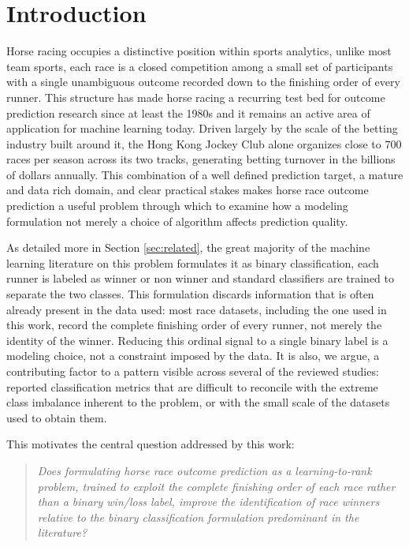 \section{Introduction}
\label{sec:introduction}

Horse racing occupies a distinctive position within sports analytics, unlike most team sports, each race is a closed competition among a small set of participants with a single unambiguous outcome recorded down to the finishing order of every runner. This structure has made horse racing a recurring test bed for outcome prediction research since at least the 1980s \cite{article} and it remains an active area of application for machine learning today. Driven largely by the scale of the betting industry built around it, the Hong Kong Jockey Club alone organizes close to 700 races per season across its two tracks, generating betting turnover in the billions of dollars annually. This combination of a well defined prediction target, a mature and data rich domain, and clear practical stakes makes horse race outcome prediction a useful problem through which to examine how a modeling formulation not merely a choice of algorithm affects prediction quality.

As detailed more in Section \ref{sec:related}, the great majority of the machine learning literature on this problem formulates it as binary classification, each runner is labeled as winner or non winner and standard classifiers are trained to separate the two classes. This formulation discards information that is often already present in the data used: most race datasets, including the one used in this work, record the complete finishing order of every runner, not merely the identity of the winner. Reducing this ordinal signal to a single binary label is a modeling choice, not a constraint imposed by the data. It is also, we argue, a contributing factor to a pattern visible across several of the reviewed studies: reported classification metrics that are difficult to reconcile with the extreme class imbalance inherent to the problem, or with the small scale of the datasets used to obtain them.

This motivates the central question addressed by this work:

\begin{quote}
\textit{Does formulating horse race outcome prediction as a learning-to-rank problem, trained to exploit the complete finishing order of each race rather than a binary win/loss label, improve the identification of race winners relative to the binary classification formulation predominant in the literature?}
\end{quote}

